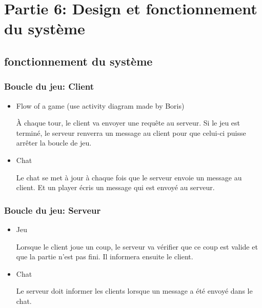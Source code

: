 \section{Partie 6: Design et fonctionnement du système}
\subsection{fonctionnement du système}
\subsubsection{Boucle du jeu: Client}
\begin{itemize}
    \item Flow of a game (use activity diagram made by Boris)

        À chaque tour, le client va envoyer une requête au serveur. Si le jeu est terminé, le serveur renverra un message au client pour que
        celui-ci puisse arrêter la boucle de jeu.
    \item Chat

        Le chat se met à jour à chaque fois que le serveur envoie un message au client. Et un player écris un message qui est envoyé au serveur.
\end{itemize}
\subsubsection{Boucle du jeu: Serveur}
\begin{itemize}
    \item Jeu

        Lorsque le client joue un coup, le serveur va vérifier que ce coup est valide et que la partie n'est pas fini. Il informera ensuite
        le client.

    \item Chat
    
        Le serveur doit informer les clients lorsque un message a été envoyé dans le chat.


\end{itemize}
